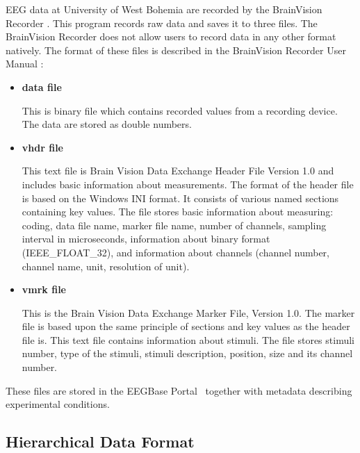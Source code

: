 \documentclass[conference]{IEEEtran}
\begin{document}
EEG data at University of West Bohemia are recorded by the BrainVision Recorder \cite{brainvision}. This program records raw data and saves it to three files. The BrainVision Recorder does not allow users to record data in any other format natively. The format of these files is described in the BrainVision Recorder User Manual \cite{brainUserManual}:
\begin{itemize}
	\item \textbf{data file}
	\label{eeg}
	
	This is binary file which contains recorded values from a recording device. The data are stored as double numbers.
	
	\item \textbf{vhdr file}
	\label{vhdr}
	
	This text file is Brain Vision Data Exchange Header File Version 1.0 and includes basic information about measurements. The format of the header file is based on the Windows INI format. It consists of various named sections containing key values. The file stores basic information about measuring: coding, data file name, marker file name, number of channels, sampling interval in microseconds, information about binary format (IEEE\_FLOAT\_32), and information about channels (channel number, channel name, unit, resolution of unit).
	
	\item \textbf{vmrk file}
	\label{vmrk}
	
	This is the Brain Vision Data Exchange Marker File, Version 1.0. The marker file is based upon the same principle of sections and key values as the header file is. This text file contains information about stimuli. The file stores stimuli number, type of the stimuli, stimuli description, position, size and its channel number.
	
\end{itemize}

These files are stored in the EEGBase Portal~\cite{eegportal} together with metadata describing experimental conditions.

\subsection{Hierarchical Data Format}
\end{document}
